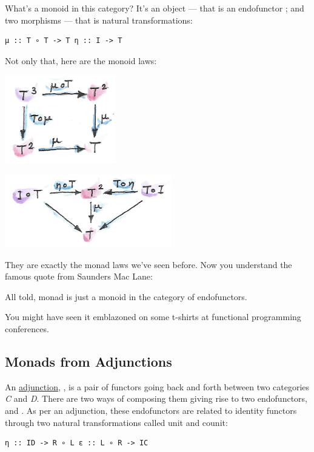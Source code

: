 What's a monoid in this category? It's an object --- that is an
endofunctor ; and two morphisms --- that is natural
transformations:

\begin{verbatim}
μ :: T ∘ T -> T η :: I -> T
\end{verbatim}

Not only that, here are the monoid laws:

\includegraphics[width=1.90625in]{images/assoc.png}

\includegraphics[width=2.86458in]{images/unitlawcomp.png}

They are exactly the monad laws we've seen before. Now you understand
the famous quote from Saunders Mac Lane:

All told, monad is just a monoid in the category of endofunctors.

You might have seen it emblazoned on some t-shirts at functional
programming conferences.

\subsection{Monads from Adjunctions}\label{monads-from-adjunctions}

An
\href{https://bartoszmilewski.com/2016/04/18/adjunctions/}{adjunction},
, is a pair of functors going back and forth between two
categories \emph{C} and \emph{D}. There are two ways of composing them
giving rise to two endofunctors,  and .
As per an adjunction, these endofunctors are related to identity
functors through two natural transformations called unit and counit:

\begin{verbatim}
η :: ID -> R ∘ L ε :: L ∘ R -> IC
\end{verbatim}

